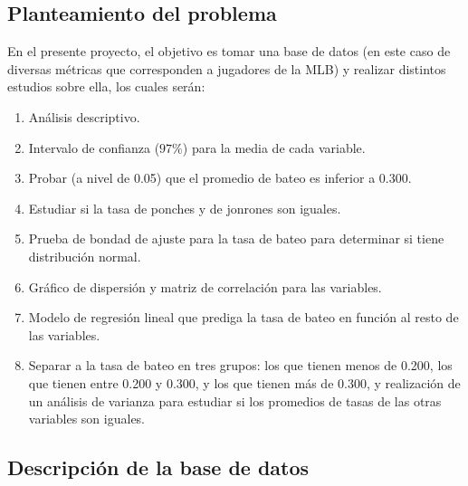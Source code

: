 \documentclass{staprojteamusb}
\begin{document}
	
	
	\maketitle
	
	
	\vspace{-13mm}
	\hypertarget{planteamiento-del-problema}{%
 \subsection{Planteamiento del problema}\label{planteamiento-del-problema}}

 En el presente proyecto, el objetivo es tomar una base de datos (en este caso de diversas métricas que corresponden a jugadores de la MLB) y realizar distintos estudios sobre ella, los cuales serán:

 \begin{enumerate}
   \item Análisis descriptivo.
   \item Intervalo de confianza ($97\%$) para la media de cada variable.
   \item Probar (a nivel de 0.05) que el promedio de bateo es inferior a 0.300.
   \item Estudiar si la tasa de ponches y de jonrones son iguales.
   \item Prueba de bondad de ajuste para la tasa de bateo para determinar si tiene distribución normal.
   \item Gráfico de dispersión y matriz de correlación para las variables.
   \item Modelo de regresión lineal que prediga la tasa de bateo en función al resto de las variables.
   \item Separar a la tasa de bateo en tres grupos: los que tienen menos de 0.200, los que tienen entre 0.200 y 0.300, y los que tienen más de 0.300, y realización de un análisis de varianza para estudiar si los promedios de tasas de las otras variables son iguales.
 \end{enumerate}



 \hypertarget{descripciuxf3n-de-la-base-de-datos}{%
 \subsection{Descripción de la base de datos}\label{descripciuxf3n-de-la-base-de-datos}}
\end{document}
